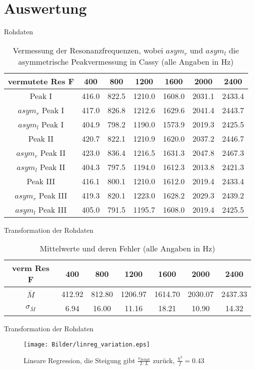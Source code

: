 \documentclass[11pt]{beamer}
\begin{document}
\section{Auswertung}
\begin{frame}{Rohdaten}
\begin{table}[H]
\begin{tabular}{c|c|c|c|c|c|c}
vermutete Res F & 400 & 800 & 1200 & 1600 & 2000 & 2400 \\ 
\hline 
Peak I & 416.0 & 822.5 & 1210.0 & 1608.0 & 2031.1 & 2433.4 \\  
$asym_r$ Peak I & 417.0 & 826.8 & 1212.6 & 1629.6 & 2041.4 & 2443.7 \\  
$asym_l$ Peak I & 404.9 & 798.2 & 1190.0 & 1573.9 & 2019.3 & 2425.5 \\ 
\hline 
Peak II & 420.7 & 822.1 & 1210.9 & 1620.0 & 2037.2 & 2446.7 \\  
$asym_r$ Peak II & 423.0 & 836.4 & 1216.5 & 1631.3 & 2047.8 & 2467.3 \\ 
$asym_l$ Peak II & 404.3 & 797.5 & 1194.0 & 1612.3 & 2013.8 & 2421.3 \\ 
\hline 
Peak III & 416.1 & 800.1 & 1210.0 & 1612.0 & 2019.4 & 2433.4 \\  
$asym_r$ Peak III & 419.3 & 820.1 & 1223.0 & 1628.2 & 2029.3 & 2439.2 \\  
$asym_l$ Peak III & 405.0 & 791.5 & 1195.7 & 1608.0 & 2019.4 & 2425.5
\end{tabular}
\caption{Vermessung der Resonanzfrequenzen, wobei $asym_r$ und $asym_l$ die asymmetrische Peakvermessung in Cassy (alle Angaben in Hz)} 
\end{table}
\end{frame}

\begin{frame}{Transformation der Rohdaten}
\begin{table}[H]
\begin{tabular}{c|c|c|c|c|c|c}
verm Res F &400&800&1200&1600&2000&2400\\ 
\hline 
$\bar{M}$ & 412.92 & 812.80 & 1206.97 & 1614.70 & 2030.07 & 2437.33 \\ 
\hline 
$\sigma_{\bar{M}}$ & 6.94 & 16.00 & 11.16 & 18.21 & 10.90 & 14.32 \\ 
\end{tabular}
\caption{Mittelwerte und deren Fehler (alle Angaben in Hz)} 
\end{table}
\end{frame}

\begin{frame}{Transformation der Rohdaten}
\begin{figure}[H]
\centering
\texttt{[image: Bilder/linreg\_variation.eps]}
\caption{Lineare Regression, die Steigung gibt $\frac{v_{Schall}}{2\cdot L}$ zurück, $\frac{\chi^2}{f} = 0.43$}
\end{figure}
\end{frame}
\end{document}
